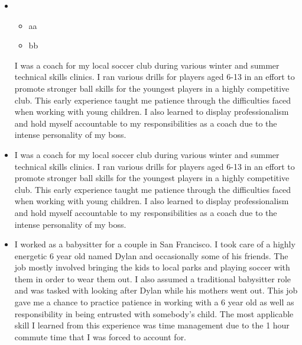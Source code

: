\documentclass[11pt,a4paper,sans]{moderncv}        %
\begin{document}
\begin{itemize}

	\item{
		{\vspace{3pt}
			\begin{itemize}
				\item aa
				\item bb
			\end{itemize}
			I was a coach for my local soccer club during various winter and summer technical skills clinics. I ran various drills for players aged 6-13 in an effort to promote stronger ball skills for the youngest players in a highly competitive club. This early experience taught me patience through the difficulties faced when working with young children. I also learned to display professionalism and hold myself accountable to my responsibilities as a coach due to the intense personality of my boss. }}

	\vspace{6pt}

	\item{
		{\vspace{3pt}
			I was a coach for my local soccer club during various winter and summer technical skills clinics. I ran various drills for players aged 6-13 in an effort to promote stronger ball skills for the youngest players in a highly competitive club. This early experience taught me patience through the difficulties faced when working with young children. I also learned to display professionalism and hold myself accountable to my responsibilities as a coach due to the intense personality of my boss. }}


	\vspace{6pt}

	\item{
		{\vspace{3pt}
			I worked as a babysitter for a couple in San Francisco. I took care of a highly energetic 6 year old named Dylan and occasionally some of his friends. The job mostly involved bringing the kids to local parks and playing soccer with them in order to wear them out. I also assumed a traditional babysitter role and was tasked with looking after Dylan while his mothers went out. This job gave me a chance to practice patience in working with a 6 year old as well as responsibility in being entrusted with somebody's child. The most applicable skill I learned from this experience was time management due to the 1 hour commute time that I was forced to account for. }}


\end{itemize}
\end{document}
